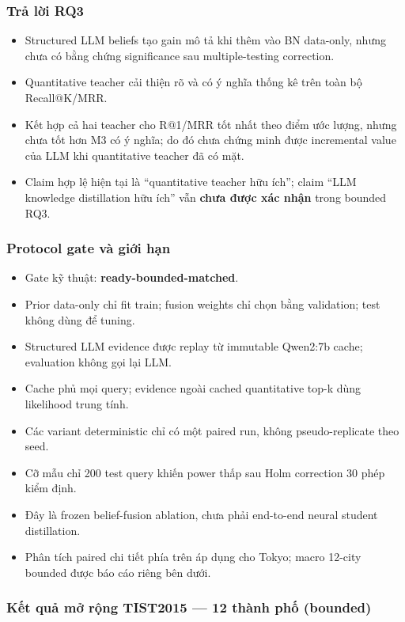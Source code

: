 \subsubsection*{Trả lời RQ3}

\begin{itemize}
\item Structured LLM beliefs tạo gain mô tả khi thêm vào BN data-only, nhưng chưa có bằng chứng significance sau multiple-testing correction.
\item Quantitative teacher cải thiện rõ và có ý nghĩa thống kê trên toàn bộ Recall@K/MRR.
\item Kết hợp cả hai teacher cho R@1/MRR tốt nhất theo điểm ước lượng, nhưng chưa tốt hơn M3 có ý nghĩa; do đó chưa chứng minh được incremental value của LLM khi quantitative teacher đã có mặt.
\item Claim hợp lệ hiện tại là “quantitative teacher hữu ích”; claim “LLM knowledge distillation hữu ích” vẫn \textbf{chưa được xác nhận} trong bounded RQ3.
\end{itemize}

\subsubsection*{Protocol gate và giới hạn}

\begin{itemize}
\item Gate kỹ thuật: \textbf{ready-bounded-matched}.
\item Prior data-only chỉ fit train; fusion weights chỉ chọn bằng validation; test không dùng để tuning.
\item Structured LLM evidence được replay từ immutable Qwen2:7b cache; evaluation không gọi lại LLM.
\item Cache phủ mọi query; evidence ngoài cached quantitative top-k dùng likelihood trung tính.
\item Các variant deterministic chỉ có một paired run, không pseudo-replicate theo seed.
\item Cỡ mẫu chỉ 200 test query khiến power thấp sau Holm correction 30 phép kiểm định.
\item Đây là frozen belief-fusion ablation, chưa phải end-to-end neural student distillation.
\item Phân tích paired chi tiết phía trên áp dụng cho Tokyo; macro 12-city bounded được báo cáo riêng bên dưới.
\end{itemize}

\subsubsection*{Kết quả mở rộng TIST2015 --- 12 thành phố (bounded)}

